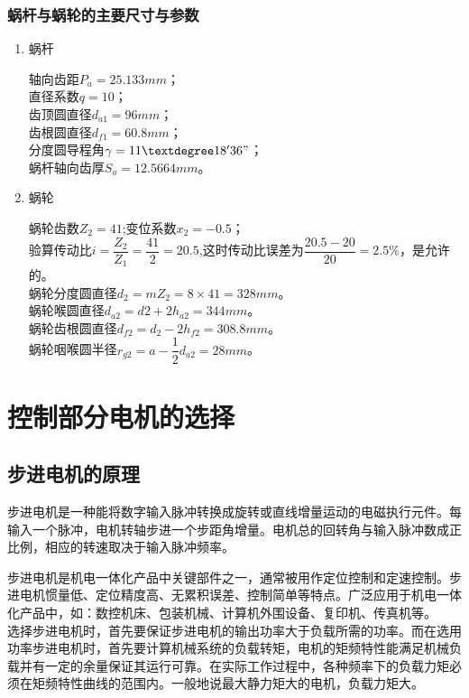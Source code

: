 \documentclass[a4paper,12pt]{article}
\begin{document}
\subsubsection{蜗杆与蜗轮的主要尺寸与参数}
\begin{enumerate}
	\item 蜗杆
	
	轴向齿距$P_a=25.133mm$；\\直径系数$q=10$；\\齿顶圆直径$d_{a1}=96mm$；\\齿根圆直径$d_{f1}=60.8mm$；\\分度圆导程角$\gamma=11\textdegree 18' 36"$；\\蜗杆轴向齿厚$S_a=12.5664mm$。
	
	\item 蜗轮
	
	蜗轮齿数$Z_2=41$;变位系数$x_2=-0.5$；\\
	验算传动比$i=\dfrac{Z_2}{Z_1}=\dfrac{41}{2}=20.5$,这时传动比误差为$\dfrac{20.5-20}{20}=2.5\%$，是允许的。\\
	蜗轮分度圆直径$d_2=mZ_2=8\times 41=328mm$。\\
	蜗轮喉圆直径$d_{a2}=d2+2h_{a2}=344mm$。\\
	蜗轮齿根圆直径$d_{f2}=d_2-2h_{f2}=308.8mm$。\\
	蜗轮咽喉圆半径$r_{g2}=a-\dfrac{1}{2}d_{a2}=28mm$。
	
\end{enumerate}

\section{控制部分电机的选择}
\subsection{步进电机的原理}
步进电机是一种能将数字输入脉冲转换成旋转或直线增量运动的电磁执行元件。每输入一个脉冲，电机转轴步进一个步距角增量。电机总的回转角与输入脉冲数成正比例，相应的转速取决于输入脉冲频率。 

步进电机是机电一体化产品中关键部件之一，通常被用作定位控制和定速控制。步进电机惯量低、定位精度高、无累积误差、控制简单等特点。广泛应用于机电一体化产品中，如：数控机床、包装机械、计算机外围设备、复印机、传真机等。
 
选择步进电机时，首先要保证步进电机的输出功率大于负载所需的功率。而在选用功率步进电机时，首先要计算机械系统的负载转矩，电机的矩频特性能满足机械负载并有一定的余量保证其运行可靠。在实际工作过程中，各种频率下的负载力矩必须在矩频特性曲线的范围内。一般地说最大静力矩大的电机，负载力矩大。 
\end{document}
